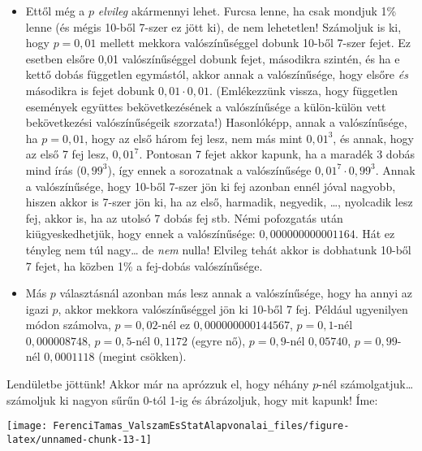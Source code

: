 \documentclass[magyar,]{book}
\providecommand{\tightlist}{%
  \setlength{\itemsep}{0pt}\setlength{\parskip}{0pt}}
\begin{document}
\begin{itemize}
\tightlist
\item
  Ettől még a \(p\) \emph{elvileg} akármennyi lehet. Furcsa lenne, ha csak mondjuk 1\% lenne (és mégis 10-ből 7-szer ez jött ki), de nem lehetetlen! Számoljuk is ki, hogy \(p=0,\!01\) mellett mekkora valószínűséggel dobunk 10-ből 7-szer fejet. Ez esetben elsőre 0,01 valószínűséggel dobunk fejet, másodikra szintén, és ha e kettő dobás független egymástól, akkor annak a valószínűsége, hogy elsőre \emph{és} másodikra is fejet dobunk \(0,\!01 \cdot 0,\!01\). (Emlékezzünk vissza, hogy független események együttes bekövetkezésének a valószínűsége a külön-külön vett bekövetkezési valószínűségeik szorzata!) Hasonlóképp, annak a valószínűsége, ha \(p=0,\!01\), hogy az első három fej lesz, nem más mint \(0,\!01^3\), és annak, hogy az első 7 fej lesz, \(0,\!01^7\). Pontosan 7 fejet akkor kapunk, ha a maradék 3 dobás mind írás (\(0,\!99^3\)), így ennek a sorozatnak a valószínűsége \(0,\!01^7 \cdot 0,\!99^3\). Annak a valószínűsége, hogy 10-ből 7-szer jön ki fej azonban ennél jóval nagyobb, hiszen akkor is 7-szer jön ki, ha az első, harmadik, negyedik, \ldots, nyolcadik lesz fej, akkor is, ha az utolsó 7 dobás fej stb. Némi pofozgatás után kiügyeskedhetjük, hogy ennek a valószínűsége: \(0,\!000000000001164\). Hát ez tényleg nem túl nagy\ldots{} de \emph{nem} nulla! Elvileg tehát akkor is dobhatunk 10-ből 7 fejet, ha közben 1\% a fej-dobás valószínűsége.
\item
  Más \(p\) választásnál azonban más lesz annak a valószínűsége, hogy ha annyi az igazi \(p\), akkor mekkora valószínűséggel jön ki 10-ből 7 fej. Például ugyenilyen módon számolva, \(p=0,\!02\)-nél ez \(0,\!000000000144567\), \(p=0,\!1\)-nél \(0,\!000008748\), \(p=0,\!5\)-nél \(0,\!1172\) (egyre nő), \(p=0,\!9\)-nél \(0,\!05740\), \(p=0,\!99\)-nél \(0,\!0001118\) (megint csökken).
\end{itemize}

Lendületbe jöttünk! Akkor már na aprózzuk el, hogy néhány \(p\)-nél számolgatjuk\ldots{} számoljuk ki nagyon sűrűn 0-tól 1-ig és ábrázoljuk, hogy mit kapunk! Íme:

\begin{center}\texttt{[image: FerenciTamas\_ValszamEsStatAlapvonalai\_files/figure-latex/unnamed-chunk-13-1]} \end{center}
\end{document}
